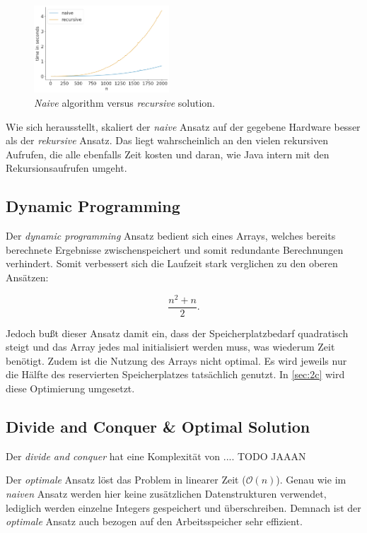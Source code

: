 \documentclass[10pt]{article}
\begin{document}
    \begin{figure}[ht]
        \centering
        \includegraphics[width=0.45\textwidth]{../naive_vs_rec_times.png}
        \caption{\textit{Naive} algorithm versus \textit{recursive} solution.}
    \end{figure}

        \newpage
    Wie sich herausstellt, skaliert der \textit{naive} Ansatz auf der gegebene Hardware besser als der \textit{rekursive} Ansatz.
    Das liegt wahrscheinlich an den vielen rekursiven Aufrufen, die alle ebenfalls Zeit kosten und daran, wie Java 
    intern mit den Rekursionsaufrufen umgeht. 

    \subsection{Dynamic Programming}\label{sec:dynamic}
    Der \textit{dynamic programming} Ansatz bedient sich eines Arrays, welches bereits berechnete Ergebnisse zwischenspeichert und somit
    redundante Berechnungen verhindert. Somit verbessert sich die Laufzeit stark verglichen zu den oberen Ansätzen:

    \[
        \frac{n^{2}+n}{2} 
    .\]

    Jedoch bu\ss t dieser Ansatz damit ein, dass der Speicherplatzbedarf quadratisch steigt und das Array jedes mal 
    initialisiert werden muss, was wiederum Zeit benötigt. Zudem ist die Nutzung des Arrays nicht optimal. Es wird jeweils nur die 
    Hälfte des reservierten Speicherplatzes tatsächlich genutzt. In \ref{sec:2c} wird diese Optimierung 
    umgesetzt.

    \subsection{Divide and Conquer \& Optimal Solution}
   Der \textit{divide and conquer} hat eine Komplexität von ....
       TODO JAAAN



   Der \textit{optimale} Ansatz löst das Problem in linearer Zeit ($\mathcal O (n)$). 
   Genau wie im \textit{naiven} Ansatz werden hier keine zusätzlichen Datenstrukturen verwendet,
   lediglich werden einzelne Integers gespeichert und überschreiben. Demnach ist der \textit{optimale}
   Ansatz auch bezogen auf den Arbeitsspeicher sehr effizient. 
\end{document}
